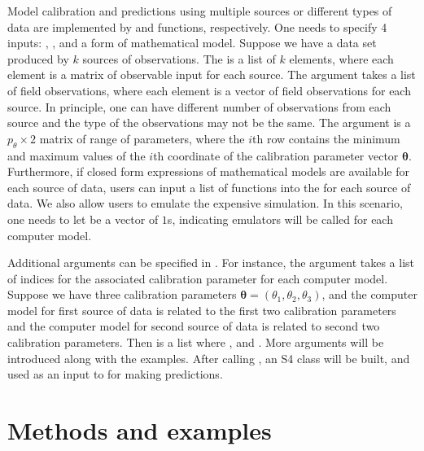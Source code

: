 Model calibration and predictions using multiple sources or different types of data are implemented by   and  functions, respectively. One needs to specify 4 inputs: , ,  and a form of mathematical model. Suppose we have a data set produced by $k$ sources of observations.  The  is a list of $k$ elements, where each element is a matrix of observable input for each source. The  argument  takes a list of field observations, where each element is a vector of field observations for each source. In principle, one can have different number of observations from each source and the type of the observations may not be the same. 
The  argument  is a $p_{\theta}\times 2$ matrix of  range of parameters, where {the $i$th row} contains the minimum and maximum values of the $i$th coordinate of the calibration parameter vector $\bm \theta$. Furthermore, if closed form expressions of mathematical models are available for each source of data, users can input a list of functions into the  for each source of data. We also allow users to emulate the expensive simulation. In this scenario, one needs to let  be a vector of $1$s, indicating emulators will be called for each computer model. 

 Additional arguments can be specified in . For instance, the argument  takes a list of indices for the associated calibration parameter for each computer model. Suppose we have three calibration parameters $\bm \theta=(\theta_1,\theta_2,\theta_3)$, and the computer model for first source of data is related to the first two calibration parameters and  the computer model for second source of data is related to second two calibration parameters. Then  is a list where , and . More arguments will be introduced along with the examples. 
   After calling , an S4 class  will be built, and used as an input to  for making predictions. 


\section[Methods and examples]{Methods and examples}


